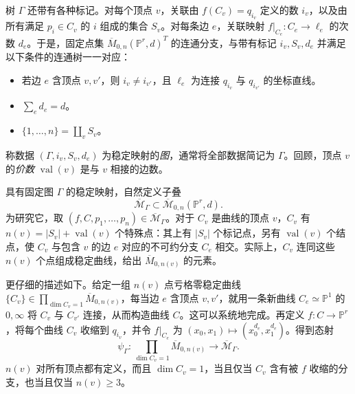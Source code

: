 树 $\Gamma$ 还带有各种标记。对每个顶点 $v$，关联由 $f(C_v)=q_{i_v}$ 定义的数 $i_v$，以及由所有满足 $p_i\in C_v$ 的 $i$ 组成的集合 $S_v$。对每条边 $e$，关联映射 $f|_{C_e}:C_e\to\ell_e$ 的次数 $d_e$。于是，固定点集 $\overline M_{0,n}(\mathbb P^r,d)^T$ 的连通分支，与带有标记 $i_v,S_v,d_e$ 并满足以下条件的连通树一一对应：
\begin{itemize}
\item 若边 $e$ 含顶点 $v,v'$，则 $i_v\ne i_{v'}$，且 $\ell_e$ 为连接 $q_{i_v}$ 与 $q_{i_{v'}}$ 的坐标直线。
\item $\sum_ed_e=d$。
\item $\{1,\ldots,n\}=\coprod_vS_v$。
\end{itemize}
称数据 $(\Gamma,i_v,S_v,d_e)$ 为稳定映射的\emph{图}，通常将全部数据简记为 $\Gamma$。回顾，顶点 $v$ 的\emph{价数} $\operatorname{val}(v)$ 是与 $v$ 相接的边数。

具有固定图 $\Gamma$ 的稳定映射，自然定义子叠
\[
\overline{\mathcal M}_\Gamma\subset\overline{\mathcal M}_{0,n}(\mathbb P^r,d).
\]
为研究它，取 $(f,C,p_1,\ldots,p_n)\in\overline{\mathcal M}_\Gamma$。对于 $C_v$ 是曲线的顶点 $v$，$C_v$ 有 $n(v)=|S_v|+\operatorname{val}(v)$ 个特殊点：其上有 $|S_v|$ 个标记点，另有 $\operatorname{val}(v)$ 个结点，使 $C_v$ 与包含 $v$ 的边 $e$ 对应的不可约分支 $C_e$ 相交。实际上，$C_v$ 连同这些 $n(v)$ 个点组成稳定曲线，给出 $\overline M_{0,n(v)}$ 的元素。

更仔细的描述如下。给定一组 $n(v)$ 点亏格零稳定曲线 $\{C_v\}\in\prod_{\dim C_v=1}\overline M_{0,n(v)}$，每当边 $e$ 含顶点 $v,v'$，就用一条新曲线 $C_e\simeq\mathbb P^1$ 的 $0,\infty$ 将 $C_v$ 与 $C_{v'}$ 连接，从而构造曲线 $C$。这可以系统地完成。再定义 $f:C\to\mathbb P^r$，将每个曲线 $C_v$ 收缩到 $q_{i_v}$，并令 $f|_{C_e}$ 为 $(x_0,x_1)\mapsto(x_0^{d_e},x_1^{d_e})$。得到态射
\[
\psi_\Gamma:\prod_{\dim C_v=1}\overline M_{0,n(v)}\longrightarrow\overline{\mathcal M}_\Gamma.
\]
$n(v)$ 对所有顶点都有定义，而且 $\dim C_v=1$，当且仅当 $C_v$ 含有被 $f$ 收缩的分支，也当且仅当 $n(v)\ge3$。

